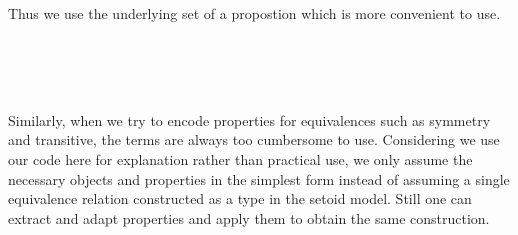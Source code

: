 \begin{code}
%
\\
\> \AgdaSymbol{:} \AgdaSymbol{\{} \AgdaSymbol{:} \AgdaSymbol{\}\{} \AgdaSymbol{:}  \AgdaSymbol{\}}   \AgdaSymbol{(} \AgdaSymbol{)} \<[51]%
\>[51]\<%
\\
\>[10]\<[12]%
\>[12] \AgdaSymbol{(} \AgdaSymbol{:}   \AgdaSymbol{)}   \AgdaFunction{[}  \AgdaFunction{]fm}    \<[45]%
\>[45] \AgdaFunction{[}  \AgdaFunction{]fm}    \<%
\\
\>     \AgdaSymbol{=}  \AgdaSymbol{(} \AgdaSymbol{(}\AgdaFunction{[}  \AgdaFunction{]tm} \AgdaSymbol{)} \AgdaSymbol{)} \<%
\\
\end{code}

Thus we use the underlying set of a propostion which is more convenient to use.

\begin{code}\>\<%
\\
\> \AgdaSymbol{:} \AgdaSymbol{\{} \AgdaSymbol{:} \AgdaSymbol{\}(} \AgdaSymbol{:}  \AgdaSymbol{)(} \AgdaSymbol{:}   \AgdaSymbol{)}  \<%
\\
\> \AgdaSymbol{\{}\AgdaSymbol{\}}   \AgdaSymbol{=}  \AgdaFunction{[}  \AgdaFunction{]fm}     \AgdaFunction{[}  \AgdaFunction{]fm}    \<%
\\
\>\<\end{code}

Similarly, when we try to encode properties for equivalences such as symmetry and transitive, the terms are always too cumbersome to use. Considering we use our code here for explanation rather than practical use, we only assume the necessary objects and properties in the simplest form instead of assuming a single equivalence relation constructed as a type in the setoid model. Still one can extract and adapt properties and apply them to obtain the same construction.

